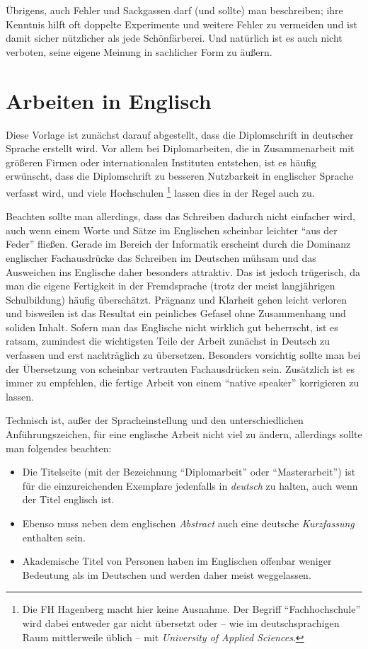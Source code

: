 Übrigens, auch Fehler und Sackgassen darf (und sollte) man
beschreiben; ihre Kenntnis hilft oft doppelte Experimente und
weitere Fehler zu vermeiden und ist damit sicher nützlicher als
jede Schönfärberei.
Und natürlich ist es auch nicht verboten, seine eigene Meinung 
in sachlicher Form zu äußern.


\section{Arbeiten in Englisch}
\label{sec:englisch}

Diese Vorlage ist zunächst darauf abgestellt, dass die
Diplomschrift in deutscher Sprache erstellt wird. Vor allem bei
Diplomarbeiten, die in Zusammenarbeit mit größeren Firmen oder
internationalen Instituten entstehen, ist es häufig erwünscht,
dass die Diplomschrift zu besseren Nutzbarkeit in englischer
Sprache verfasst wird, und viele Hochschulen%
\footnote{Die FH Hagenberg macht hier keine Ausnahme. 
Der Begriff "`Fachhochschule"' wird dabei entweder gar nicht
übersetzt oder -- wie im deutschsprachigen Raum mittlerweile üblich -- 
mit \emph{University of Applied Sciences}.
} 
lassen dies in
der Regel auch zu.

Beachten sollte man allerdings, dass das Schreiben dadurch nicht
einfacher wird, auch wenn einem Worte und Sätze im Englischen
scheinbar leichter "`aus der Feder"' fließen. Gerade im Bereich
der Informatik erscheint durch die Dominanz englischer
Fachausdrücke das Schreiben im Deutschen mühsam und das Ausweichen
ins Englische daher besonders attraktiv. Das ist jedoch
trügerisch, da man die eigene Fertigkeit in der Fremdsprache
(trotz der meist langjährigen Schulbildung) häufig überschätzt.
Prägnanz und Klarheit gehen leicht verloren und bisweilen ist das
Resultat ein peinliches Gefasel ohne Zusammenhang und soliden
Inhalt. Sofern man das Englische nicht wirklich gut beherrscht, ist
es ratsam, zumindest die wichtigsten Teile der Arbeit zunächst in
Deutsch zu verfassen und erst nachträglich zu übersetzen.
Besonders vorsichtig sollte man bei der Übersetzung von scheinbar
vertrauten Fachausdrücken sein. Zusätzlich ist es immer zu
empfehlen, die fertige Arbeit von einem "`native speaker"'
korrigieren zu lassen.



Technisch ist, außer der Spracheinstellung und den
unterschiedlichen Anführungszeichen, für eine englische Arbeit
nicht viel zu ändern, allerdings sollte man folgendes beachten:
%
\begin{itemize}
\item  Die Titelseite (mit der Bezeichnung "`Diplomarbeit"' oder "`Masterarbeit"') 
ist für die einzureichenden Exemplare jedenfalls in \emph{deutsch} zu halten,
auch wenn der Titel englisch ist. 
\item Ebenso muss neben dem
englischen \emph{Abstract} auch eine deutsche \emph{Kurzfassung}
enthalten sein. %
\item Akademische Titel von Personen haben im Englischen offenbar
weniger Bedeutung als im Deutschen und werden daher meist
weggelassen.
\end{itemize}
